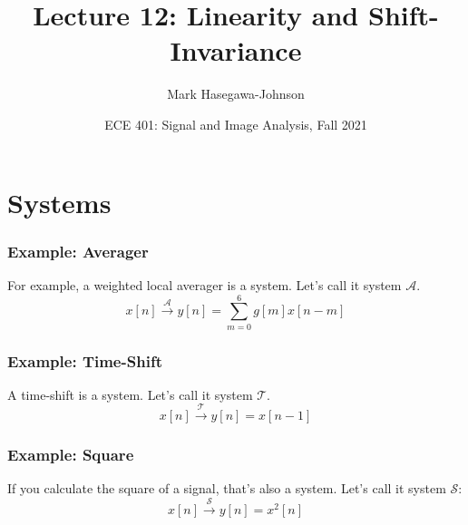 \documentclass{beamer}
\title{Lecture 12: Linearity and Shift-Invariance}
\author{Mark Hasegawa-Johnson}
\date{ECE 401: Signal and Image Analysis, Fall 2021}
\begin{document}
\begin{frame}
  \maketitle
\end{frame}

\begin{frame}
  \tableofcontents
\end{frame}

\section[Systems]{Systems}
\setcounter{subsection}{1}


\begin{frame}
  \frametitle{Example: Averager}

  For example, a weighted local averager is a system.  Let's call it
  system ${\mathcal A}$.
  \[
  x[n]\stackrel{\mathcal A}{\longrightarrow} y[n]=\sum_{m=0}^6 g[m] x[n-m]
  \]
\end{frame}

\begin{frame}
  \frametitle{Example: Time-Shift}

  A time-shift is a system.  Let's call it
  system ${\mathcal T}$.
  \[
  x[n]\stackrel{\mathcal T}{\longrightarrow} y[n]=x[n-1]
  \]
\end{frame}

\begin{frame}
  \frametitle{Example: Square}

  If you calculate the square of a signal, that's also a system.
  Let's call it system ${\mathcal S}$:
  \[
  x[n]\stackrel{\mathcal S}{\longrightarrow} y[n]=x^2[n]
  \]
  
\end{frame}
\end{document}
